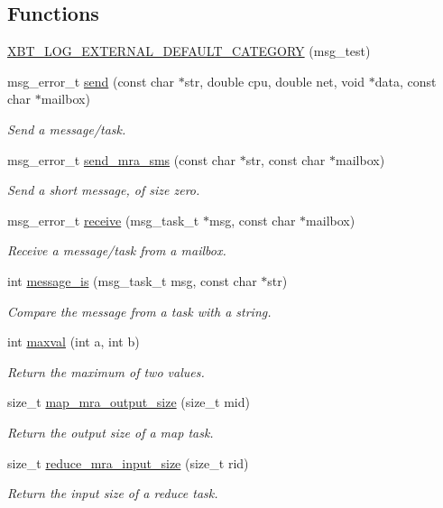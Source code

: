 \subsection*{\-Functions}
\begin{DoxyCompactItemize}
\item 
\hyperlink{common-mra_8c_a32bd1bae277b9aa336336310547bb693}{\-X\-B\-T\-\_\-\-L\-O\-G\-\_\-\-E\-X\-T\-E\-R\-N\-A\-L\-\_\-\-D\-E\-F\-A\-U\-L\-T\-\_\-\-C\-A\-T\-E\-G\-O\-R\-Y} (msg\-\_\-test)
\item 
msg\-\_\-error\-\_\-t \hyperlink{common-mra_8c_a385b12669d8faf7b5cdb54c1ae597e1c}{send} (const char $\ast$str, double cpu, double net, void $\ast$data, const char $\ast$mailbox)
\begin{DoxyCompactList}\small\item\em \-Send a message/task. \end{DoxyCompactList}\item 
msg\-\_\-error\-\_\-t \hyperlink{common-mra_8c_a305ac8e3389f94106990aa3c52c91416}{send\-\_\-mra\-\_\-sms} (const char $\ast$str, const char $\ast$mailbox)
\begin{DoxyCompactList}\small\item\em \-Send a short message, of size zero. \end{DoxyCompactList}\item 
msg\-\_\-error\-\_\-t \hyperlink{common-mra_8c_a6fc60933b9eabe64a880f68eba3131cc}{receive} (msg\-\_\-task\-\_\-t $\ast$msg, const char $\ast$mailbox)
\begin{DoxyCompactList}\small\item\em \-Receive a message/task from a mailbox. \end{DoxyCompactList}\item 
int \hyperlink{common-mra_8c_ad37a02c988c597622a346cb5293243fb}{message\-\_\-is} (msg\-\_\-task\-\_\-t msg, const char $\ast$str)
\begin{DoxyCompactList}\small\item\em \-Compare the message from a task with a string. \end{DoxyCompactList}\item 
int \hyperlink{common-mra_8c_a411d5133ab6881d40ef4cb44a7a47428}{maxval} (int a, int b)
\begin{DoxyCompactList}\small\item\em \-Return the maximum of two values. \end{DoxyCompactList}\item 
size\-\_\-t \hyperlink{common-mra_8c_a1df0d355a0754a40a7697437294d8431}{map\-\_\-mra\-\_\-output\-\_\-size} (size\-\_\-t mid)
\begin{DoxyCompactList}\small\item\em \-Return the output size of a map task. \end{DoxyCompactList}\item 
size\-\_\-t \hyperlink{common-mra_8c_a8205e98d4874b7e31f138d5016ad1eba}{reduce\-\_\-mra\-\_\-input\-\_\-size} (size\-\_\-t rid)
\begin{DoxyCompactList}\small\item\em \-Return the input size of a reduce task. \end{DoxyCompactList}\end{DoxyCompactItemize}
